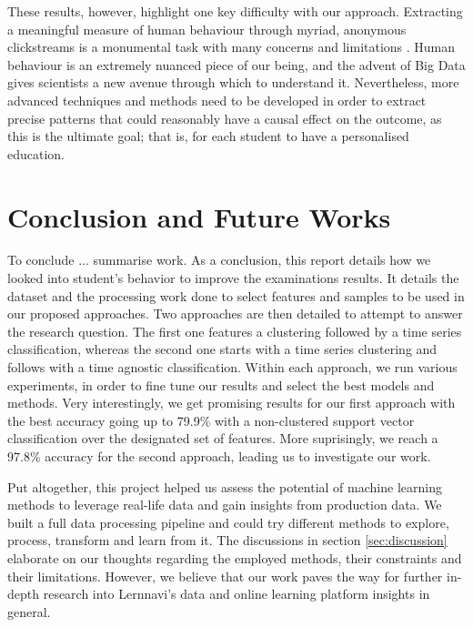 \documentclass[sigplan,screen]{acmart}
\begin{document}
These results, however, highlight one key difficulty with our approach. Extracting a meaningful measure of human behaviour through myriad, anonymous clickstreams is a monumental task with many concerns and limitations \cite{meaningfulmeasures}. Human behaviour is an extremely nuanced piece of our being, and the advent of Big Data gives scientists a new avenue through which to understand it. Nevertheless, more advanced techniques and methods need to be developed in order to extract precise patterns that could reasonably have a causal effect on the outcome, as this is the ultimate goal; that is, for each student to have a personalised education. 





\section{Conclusion and Future Works}\label{sec:conclusion}

{\color{red} To conclude ... summarise work}.
As a conclusion, this report details how we looked into student's behavior to improve the examinations results. It details the dataset and the processing work done to select features and samples to be used in our proposed approaches. Two approaches are then detailed to attempt to answer the research question. The first one features a clustering followed by a time series classification, whereas the second one starts with a time series clustering and follows with a time agnostic classification. Within each approach, we run various experiments, in order to fine tune our results and select the best models and methods. Very interestingly, we get promising results for our first approach with the best accuracy going up to 79.9\% with a non-clustered support vector classification over the designated set of features. More suprisingly, we reach a 97.8\% accuracy for the second approach, leading us to investigate our work. 

Put altogether, this project helped us assess the potential of machine learning methods to leverage real-life data and gain insights from production data. We built a full data processing pipeline and could try different methods to explore, process, transform and learn from it. The discussions in section \ref{sec:discussion} elaborate on our thoughts regarding the employed methods, their constraints and their limitations. However, we believe that our work paves the way for further in-depth research into Lernnavi's data and online learning platform insights in general. 
\end{document}
